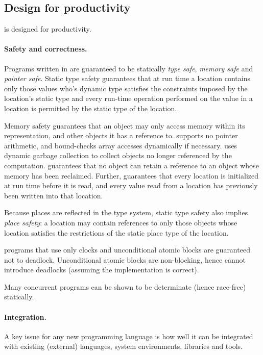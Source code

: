 \subsection{Design for productivity}
\Xten{} is designed for productivity. 

\paragraph{Safety and correctness.} 
Programs written in \Xten{} are guaranteed to be statically
\emph{type
safe}, \emph{memory safe} and \emph{pointer safe}. Static type safety
guarantees that at run time a location contains only those values who's
dynamic type satisfies the constraints imposed by the location's
static type and every run-time operation performed on the value in a
location is permitted by the static type of the location.

Memory safety guarantees that an object may only access memory within
its representation, and other objects it has a reference to. \Xten{}
supports no pointer arithmetic, and bound-checks array accesses
dynamically if necessary. \Xten{} uses dynamic garbage collection to
collect objects no longer referenced by the computation. \Xten{}
guarantees that no object can retain a reference to an object
whose memory has been reclaimed.  Further, \Xten{} guarantees that
every location is initialized at run time before it is read, 
and every value read from a location has previously been written into
that location. 


Because places are reflected in the type system, static type safety
also implies \emph{place safety}: a location may contain references to only
those objects whose location satisfies the restrictions of the static
place type of the location.

\Xten{} programs that use only clocks and unconditional atomic
blocks are guaranteed not to deadlock. Unconditional atomic blocks
are non-blocking, hence cannot introduce deadlocks (assuming the
implementation is correct).

Many concurrent programs can be shown to be determinate (hence
race-free) statically.

\paragraph{Integration.}
A key issue for any new programming language is how well it can be
integrated with existing (external) languages, system environments,
libraries and tools.

